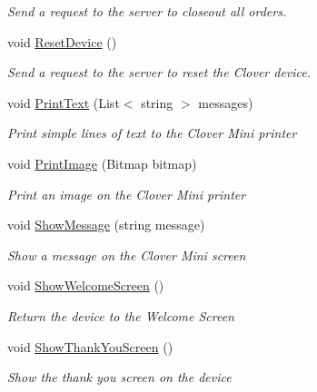 \begin{DoxyCompactItemize}
\begin{DoxyCompactList}\small\item\em Send a request to the server to closeout all orders. \end{DoxyCompactList}\item 
void \hyperlink{interfacecom_1_1clover_1_1remotepay_1_1sdk_1_1_i_clover_connector_aafead472d6f0adc74084a229bf75e5ed}{Reset\+Device} ()
\begin{DoxyCompactList}\small\item\em Send a request to the server to reset the Clover device. \end{DoxyCompactList}\item 
void \hyperlink{interfacecom_1_1clover_1_1remotepay_1_1sdk_1_1_i_clover_connector_a16a2a91c231e7a66373b2c0e2f612951}{Print\+Text} (List$<$ string $>$ messages)
\begin{DoxyCompactList}\small\item\em Print simple lines of text to the Clover Mini printer \end{DoxyCompactList}\item 
void \hyperlink{interfacecom_1_1clover_1_1remotepay_1_1sdk_1_1_i_clover_connector_ac716d55882598b92984159f4898bbe2a}{Print\+Image} (Bitmap bitmap)
\begin{DoxyCompactList}\small\item\em Print an image on the Clover Mini printer \end{DoxyCompactList}\item 
void \hyperlink{interfacecom_1_1clover_1_1remotepay_1_1sdk_1_1_i_clover_connector_a2d4c2a87f772459bb1a494e2f87835a8}{Show\+Message} (string message)
\begin{DoxyCompactList}\small\item\em Show a message on the Clover Mini screen \end{DoxyCompactList}\item 
void \hyperlink{interfacecom_1_1clover_1_1remotepay_1_1sdk_1_1_i_clover_connector_a462fd3dbb5914ac1d5b906dd1daa57c0}{Show\+Welcome\+Screen} ()
\begin{DoxyCompactList}\small\item\em Return the device to the Welcome Screen \end{DoxyCompactList}\item 
void \hyperlink{interfacecom_1_1clover_1_1remotepay_1_1sdk_1_1_i_clover_connector_adb4f9a33f3316cb349a02d05e7ddf902}{Show\+Thank\+You\+Screen} ()
\begin{DoxyCompactList}\small\item\em Show the thank you screen on the device \end{DoxyCompactList}\item 

\end{DoxyCompactItemize}
